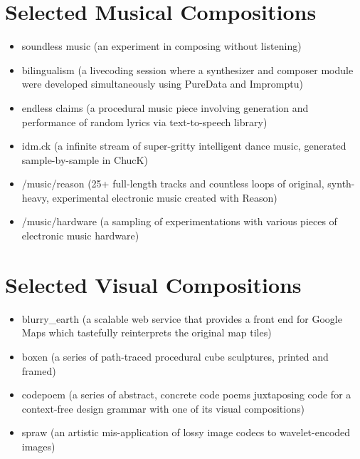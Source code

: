 \documentclass[12pt]{article}
\begin{document}
\section*{Selected Musical Compositions}
\begin{itemize}
  \item soundless music (an experiment in composing without listening)
  \item bilingualism (a livecoding session where a synthesizer and
composer module were developed simultaneously using PureData and Impromptu)
  \item endless claims (a procedural music piece involving generation and
performance of random lyrics via text-to-speech library)
  \item idm.ck (a infinite stream of super-gritty intelligent dance music,
generated sample-by-sample in ChucK) 
  \item /music/reason (25+ full-length tracks and countless loops of
original, synth-heavy, experimental electronic music created with Reason) 
  \item /music/hardware (a sampling of experimentations with various pieces of
electronic music hardware)
\end{itemize}

\section*{Selected Visual Compositions}
\begin{itemize}
  \item blurry\_earth (a scalable web service that provides a front end for Google Maps which tastefully reinterprets
the original map tiles)
  \item boxen (a series of path-traced procedural cube sculptures, printed and
framed)
  \item codepoem (a series of abstract, concrete code poems juxtaposing code for a context-free design grammar with one of its visual compositions)
  \item spraw (an artistic mis-application of lossy image codecs to
wavelet-encoded images)
\end{itemize}
\end{document}
